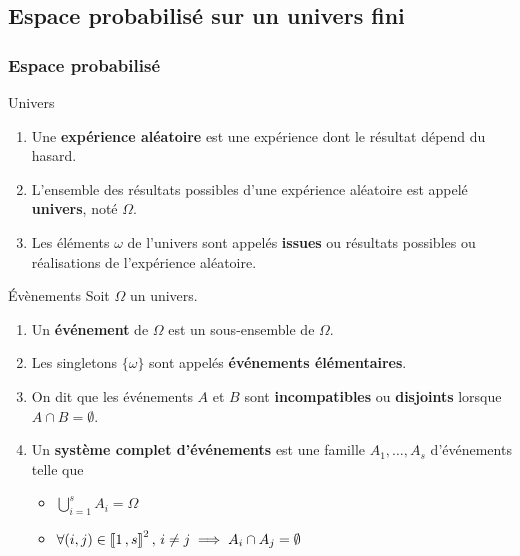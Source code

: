 \subsection{Espace probabilisé sur un univers fini}

    \subsubsection{Espace probabilisé}

    \begin{defi}{Univers}{}
        \begin{enumerate}
            \item Une \textbf{expérience aléatoire} est une expérience dont le résultat dépend du hasard.
            \item L’ensemble des résultats possibles d’une expérience aléatoire est appelé \textbf{univers}, noté $\Omega$.
            \item Les éléments $\omega$ de l’univers sont appelés \textbf{issues} ou résultats possibles ou réalisations de l’expérience aléatoire.
        \end{enumerate}
    \end{defi}

    \begin{defi}{Évènements}{}
        Soit $\Omega$ un univers.
        \begin{enumerate}
            \item Un \textbf{événement} de $\Omega$ est un sous-ensemble de $\Omega$.
            \item Les singletons $\{ \omega \}$ sont appelés \textbf{événements élémentaires}.
            \item On dit que les événements $A$ et $B$ sont \textbf{incompatibles} ou \textbf{disjoints} lorsque $A \cap B = \emptyset$.
            \item Un \textbf{système complet d’événements} est une famille $A_1,\ldots,A_s$ d’événements telle que
            \begin{itemize}
                \item $\bigcup\limits_{i=1}^s A_i = \Omega$
                \item $\forall (i,j) \in \left\llbracket 1 \, , s \right\rrbracket^2, \, i \neq j \implies A_i \cap A_j = \emptyset$
            \end{itemize}
        \end{enumerate}
    \end{defi}

